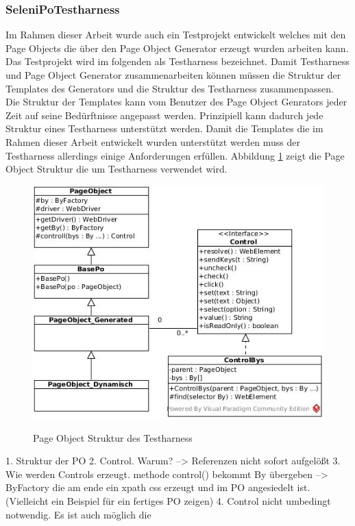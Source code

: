 \subsubsection{SeleniPoTestharness}
\label{sec:selenipotestharness}

Im Rahmen dieser Arbeit wurde auch ein Testprojekt entwickelt welches mit den Page Objects die über den Page Object Generator erzeugt wurden arbeiten kann.
Das Testprojekt wird im folgenden als Testharness bezeichnet.
Damit Testharness und Page Object Generator zusammenarbeiten können müssen die Struktur der Templates des Generators und die Struktur des Testharness zusammenpassen.
Die Struktur der Templates kann vom Benutzer des Page Object Genrators jeder Zeit auf seine Bedürftnisse angepasst werden. Prinzipiell kann dadurch jede Struktur eines Testharness unterstützt werden.
Damit die Templates die im Rahmen dieser Arbeit entwickelt wurden unterstützt werden muss der Testharness allerdings einige Anforderungen erfüllen.
Abbildung \ref{fig:strukturTestharness} zeigt die Page Object Struktur die um Testharness verwendet wird.
\begin{figure}[htb]
  \centering  
  \includegraphics[scale=0.5]{img/strukturTestharness.jpg}\\
  \caption{Page Object Struktur des Testharness}
  \label{fig:strukturTestharness}
\end{figure}

1. Struktur der PO
2. Control. Warum? --> Referenzen nicht sofort aufgelößt
3. Wie werden Controls erzeugt. methode control() bekommt By übergeben --> ByFactory die am ende ein xpath css erzeugt und im PO angesiedelt ist.
(Vielleicht ein Beispiel für ein fertiges PO zeigen)
4. Control nicht umbedingt notwendig. Es ist auch möglich die 


